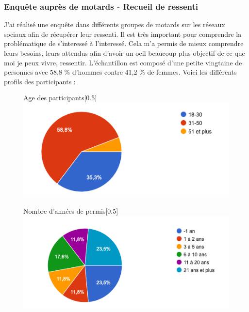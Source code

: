 \subsubsection{Enquête auprès de motards - Recueil de ressenti}
J'ai réalisé une enquête dans différents groupes de motards sur les réseaux sociaux afin de récupérer leur ressenti. Il est très important pour comprendre la problématique de s'interessé à l'interessé. Cela m'a permis de mieux comprendre leurs besoins, leurs attendus afin d'avoir un oeil beaucoup plus objectif de ce que moi je peux vivre, ressentir. L'échantillon est composé d'une petite vingtaine de personnes avec 58,8 \% d'hommes contre 41,2 \% de femmes.
Voici les différents profils des participants :
\begin{figure}[H]
  \centering
  \begin{subcaptionbox}{Age des participants}[0.5\linewidth]
    {\includegraphics[width=\linewidth]{coeur_memoire/graphique/age.png}}
  \end{subcaptionbox}
  \hfill
  \begin{subcaptionbox}{Nombre d'années de permis}[0.5\linewidth]
    {\includegraphics[width=\linewidth]{coeur_memoire/graphique/nb_annees_permis.png}}
  \end{subcaptionbox}


\end{figure}
